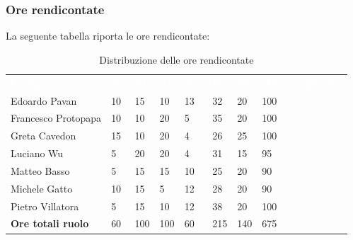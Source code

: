 \subsubsection{Ore rendicontate}
La seguente tabella riporta le ore rendicontate: 
\begin{table}[H]
\begin{center}
\renewcommand{\arraystretch}{1.25}
\begin{tabular}{ m{}<{\centering}  m{}<{\centering} m{}<{\centering} m{}<{\centering}  m{}<{\centering}  m{}<{\centering}  m{}<{\centering}  m{}<{\centering}   }
	\rowcolor{darkblue}
	\textcolor{white}{\textbf{Componente}} &\textcolor{white}{\textbf{Re}}&\textcolor{white}{\textbf{Pt}}&\textcolor{white}{\textbf{An}}&\textcolor{white}{\textbf{Am}}&\textcolor{white}{\textbf{Pr}}&\textcolor{white}{\textbf{Ve}}&\textcolor{white}{\textbf{Ore complessive}}\\ 
	Edoardo Pavan & 10 & 15 & 10 & 13 & 32 & 20 & 100 \\	
	
	Francesco Protopapa & 10 & 10 & 20 & 5 & 35 & 20 & 100 \\

	Greta Cavedon & 15 & 10 & 20 & 4 & 26 & 25 & 100 \\
	
	Luciano Wu & 5 & 20 & 20 & 4 & 31 & 15 & 95 \\
	
	Matteo Basso & 5 & 15 & 15 & 10 & 25 & 20 & 90 \\
	
	Michele Gatto & 10 & 15 & 5 & 12 & 28 & 20 & 90 \\
	
	Pietro Villatora & 5 & 15 & 10 & 12 & 38 & 20 & 100 \\
	
	\textbf{Ore totali ruolo} & 60 & 100 & 100 & 60 & 215 & 140 & 675 \\

\end{tabular}
\caption{Distribuzione delle ore rendicontate}
\end{center}
\end{table}

